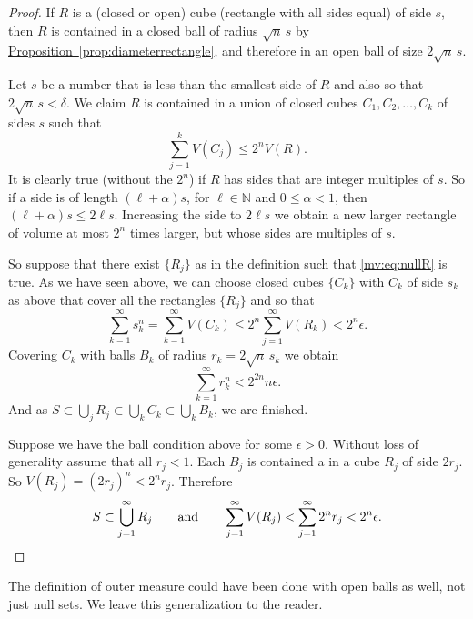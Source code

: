 \documentclass[12pt]{book}
\newcommand{\N}{{\mathbb{N}}}
\theoremstyle{plain}
\theoremstyle{remark}
\theoremstyle{definition}
\theoremstyle{exercise}
\theoremstyle{example}
\newcommand{\propref}[1]{\hyperref[#1]{Proposition~\ref*{#1}}}
\begin{document}
\begin{proof}
If $R$ is a (closed or open) cube (rectangle with all sides
equal) of side $s$, then $R$ is contained in a closed ball of radius
$\sqrt{n}\, s$ by \propref{prop:diameterrectangle}, and therefore
in an open ball of size $2 \sqrt{n}\, s$.

Let $s$ be a number that is less than the smallest side of $R$ and also
so that $2\sqrt{n} \, s < \delta$.
We claim $R$ is contained in
a union of closed cubes $C_1, C_2, \ldots, C_k$ of sides $s$ such that
\begin{equation*}
\sum_{j=1}^k V(C_j) \leq 2^n V(R) .
\end{equation*}
It is clearly true (without the $2^n$) if $R$ has sides that are
integer multiples of $s$.  So if a side is of length $(\ell+\alpha) s$, for
$\ell \in \N$ and $0 \leq \alpha < 1$, then
$(\ell+\alpha)s \leq 2\ell s$.  Increasing the side to $2\ell s$ we obtain a new larger
rectangle of volume at most $2^n$ times larger, but whose sides are
multiples of $s$.

So suppose that there exist $\{ R_j \}$ as in the definition such that
\eqref{mv:eq:nullR} is true.  As we have seen above, we can choose closed
cubes $\{ C_k \}$ with $C_k$ of side $s_k$ as above that cover all the rectangles $\{ R_j \}$
and so that
\begin{equation*}
\sum_{k=1}^\infty s_k^n =
\sum_{k=1}^\infty V(C_k) \leq
2^n \sum_{j=1}^\infty V(R_k)
< 2^n \epsilon.
\end{equation*}
Covering $C_k$ with balls $B_k$ of radius $r_k = 2\sqrt{n} \, s_k$ we obtain 
\begin{equation*}
\sum_{k=1}^\infty r_k^n <
2^{2n} n \epsilon .
\end{equation*}
And as $S \subset\bigcup_{j} R_j \subset \bigcup_{k} C_k \subset \bigcup_{k}
B_k$, we are finished.

Suppose we have the ball condition above for some $\epsilon > 0$.
Without loss of generality assume that all $r_j < 1$.
Each $B_j$ is contained a in a cube $R_j$ of side $2r_j$.
So $V(R_j) = {(2 r_j)}^n < 2^n r_j$.  Therefore 
\begin{equation*}
S \subset \bigcup_{j=1}^\infty R_j \qquad \text{and} \qquad
\sum_{j=1}^\infty V(R_j)
<
\sum_{j=1}^\infty 2^n r_j < 2^n \epsilon. \qedhere
\end{equation*}
\end{proof}

The definition of outer measure could have been done with open balls
as well, not just null sets.  We leave this generalization to the reader.
\end{document}
